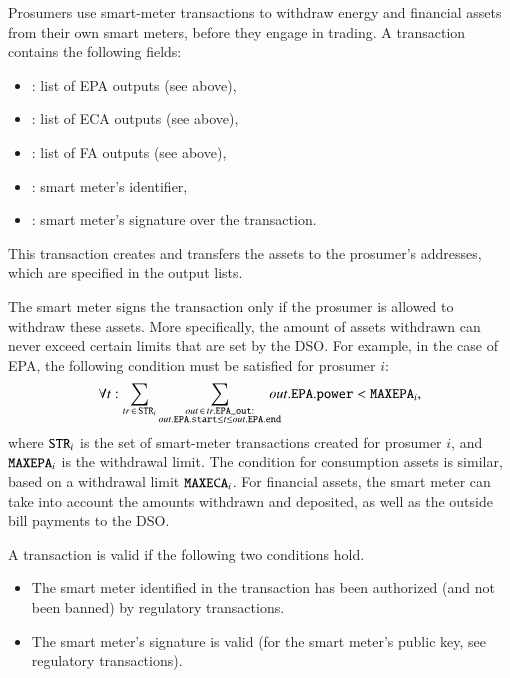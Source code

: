 Prosumers use smart-meter transactions to withdraw energy and
financial assets from their own smart meters, before they engage in
trading.
%
A transaction contains the following fields:
\begin{itemize}[noitemsep,topsep=-\parskip]
\item {}: list of EPA outputs (see above),
\item {}: list of ECA outputs (see above),
\item {}: list of FA outputs (see above),
\item {}: smart meter's identifier,
\item {}: smart meter's signature over the transaction.
\end{itemize}
\vspace{0.5\parskip} This transaction creates and transfers the assets
to the prosumer's addresses, which are specified in the output lists.

The smart meter signs the transaction only if the prosumer is allowed
to withdraw these assets.  More specifically, the amount of assets
withdrawn can never exceed certain limits that are set by the DSO.
For example, in the case of EPA, the following condition must be
satisfied for prosumer $i$:
\begin{equation*}
\forall t: \sum_{tr \,\in\, \texttt{STR}_i} \sum_{\substack{out \,\in\, tr.\texttt{EPA\_out}:\\out.\texttt{EPA}.\texttt{start} \leq t \leq out.\texttt{EPA}.\texttt{end}}} \hspace{-1em} out.\texttt{EPA}.\texttt{power} < \texttt{MAXEPA}_i ,
\end{equation*}
where $\texttt{STR}_i$ is the set of smart-meter transactions created
for prosumer $i$, and $\texttt{MAXEPA}_i$ is the withdrawal limit.  The
condition for consumption assets is similar, based on a withdrawal
limit $\texttt{MAXECA}_i$.  For financial assets, the smart meter can
take into account the amounts withdrawn and deposited, as well as the
outside bill payments to the DSO.

A transaction is valid if the following two conditions hold.
\begin{itemize}[noitemsep,topsep=-\parskip]
\item The smart meter identified in the transaction has been authorized (and not been banned) by regulatory transactions. %
\item The smart meter's signature is valid (for the smart meter's public key, see regulatory transactions).
\end{itemize}

